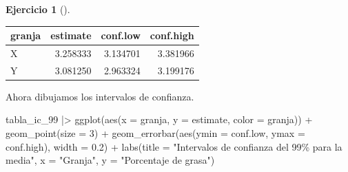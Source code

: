 \documentclass[
  a4paper,
]{scrreport}
\newenvironment{Shaded}{\begin{snugshade}}{\end{snugshade}}
\newcommand{\AttributeTok}[1]{\textcolor[rgb]{0.40,0.45,0.13}{#1}}
\newcommand{\DecValTok}[1]{\textcolor[rgb]{0.68,0.00,0.00}{#1}}
\newcommand{\FloatTok}[1]{\textcolor[rgb]{0.68,0.00,0.00}{#1}}
\newcommand{\FunctionTok}[1]{\textcolor[rgb]{0.28,0.35,0.67}{#1}}
\newcommand{\NormalTok}[1]{\textcolor[rgb]{0.00,0.23,0.31}{#1}}
\newcommand{\OtherTok}[1]{\textcolor[rgb]{0.00,0.23,0.31}{#1}}
\newcommand{\SpecialCharTok}[1]{\textcolor[rgb]{0.37,0.37,0.37}{#1}}
\newcommand{\StringTok}[1]{\textcolor[rgb]{0.13,0.47,0.30}{#1}}
\theoremstyle{definition}
\newtheorem{exercise}{Ejercicio}[chapter]
\theoremstyle{remark}
\begin{document}
\begin{exercise}[]
\begin{enumerate}
\begin{tcolorbox}
\begin{Shaded}
\end{Shaded}

  \begin{longtable}[]{@{}lrrr@{}}
  \toprule\noalign{}
  granja & estimate & conf.low & conf.high \\
  \midrule\noalign{}
  \endhead
  \bottomrule\noalign{}
  \endlastfoot
  X & 3.258333 & 3.134701 & 3.381966 \\
  Y & 3.081250 & 2.963324 & 3.199176 \\
  \end{longtable}

  Ahora dibujamos los intervalos de confianza.

\begin{Shaded}
\begin{Highlighting}[]
\NormalTok{tabla\_ic\_99  }\SpecialCharTok{|\textgreater{}} 
    \FunctionTok{ggplot}\NormalTok{(}\FunctionTok{aes}\NormalTok{(}\AttributeTok{x =}\NormalTok{ granja, }\AttributeTok{y =}\NormalTok{ estimate, }\AttributeTok{color =}\NormalTok{ granja)) }\SpecialCharTok{+}
    \FunctionTok{geom\_point}\NormalTok{(}\AttributeTok{size =} \DecValTok{3}\NormalTok{) }\SpecialCharTok{+}
    \FunctionTok{geom\_errorbar}\NormalTok{(}\FunctionTok{aes}\NormalTok{(}\AttributeTok{ymin =}\NormalTok{ conf.low, }\AttributeTok{ymax =}\NormalTok{ conf.high), }\AttributeTok{width =} \FloatTok{0.2}\NormalTok{) }\SpecialCharTok{+}
    \FunctionTok{labs}\NormalTok{(}\AttributeTok{title =} \StringTok{"Intervalos de confianza del 99\% para la media"}\NormalTok{, }\AttributeTok{x =} \StringTok{"Granja"}\NormalTok{, }\AttributeTok{y =} \StringTok{"Porcentaje de grasa"}\NormalTok{)}
\end{Highlighting}
\end{Shaded}


\end{tcolorbox}
\end{enumerate}
\end{exercise}
\end{document}
